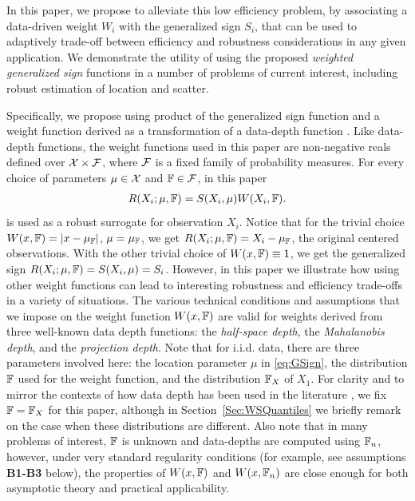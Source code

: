 In this paper, we propose to alleviate this low efficiency problem, by associating 
a data-driven weight $W_{i}$ with the generalized sign $S_{i}$, that can be used 
to adaptively trade-off between efficiency and robustness considerations in any given 
application. We demonstrate the utility of using the proposed \textit{weighted generalized sign} functions in a number of problems of current interest, including robust estimation of location and scatter.

Specifically, we propose using product of the generalized sign function and a weight function derived as a transformation of a data-depth function \citep{ref:DIMACS061_Serfling, ref:AoS00461_ZuoSerfling}. Like data-depth functions, the weight functions used in this paper are non-negative reals defined over $\mathcal{X} \times \mathcal{F}$, where $\mathcal{F}$ is a fixed family of probability measures. For every choice of parameters $\mu \in \mathcal{X}$ and ${\mathbb{F}} \in \mathcal{F}$, in this paper
%
\begin{align}
R (X_{i}; \mu, {\mathbb{F}}) = S( X_{i}, \mu) W( X_{i}, {\mathbb{F}}).
\label{eqn:rank}
\end{align}
%
is used as a robust surrogate for observation $X_{i}$.
Notice that for the trivial choice $W( x, {\mathbb{F}}) = | x - \mu_{{\mathbb{F}}} |$, 
 $\mu = \mu_{{\mathbb{F}}}$,  we get $R (X_{i}; \mu, {\mathbb{F}}) = X_{i}-\mu_{{\mathbb{F}}}$, the original centered observations. 
 With the other trivial choice of  $W( x, {\mathbb{F}}) \equiv 1$, we get the 
 generalized  sign $R (X_{i}; \mu, {\mathbb{F}}) = S(X_{i}, \mu) = S_{i}$. 
 However, in this paper we illustrate how using other weight functions
 can lead to interesting robustness and efficiency trade-offs in a variety of situations. 
 The various technical conditions and assumptions that we impose on the 
 weight function $W( x, {\mathbb{F}})$ are valid for weights derived 
 from three well-known data depth functions: the \textit{half-space depth}, 
 the \textit{Mahalanobis depth}, and the \textit{projection depth}. Note that for i.i.d. data, there are three parameters involved here: the location parameter $\mu$ in 
 \eqref{eq:GSign}, the distribution ${\mathbb{F}}$ used for the weight function, and the distribution ${\mathbb{F}}_{X}$ of $X_{1}$. For clarity and to mirror the contexts of how data depth has been used in the literature \citep{LiuPareliusSingh99, ref:DIMACS061_Serfling}, we fix ${\mathbb{F}} = {\mathbb{F}}_{X}$ for this paper, although in Section~\ref{Sec:WSQuantiles} we briefly remark on the case when these  distributions are different. Also note that 
 in many problems of interest, ${\mathbb{F}}$ is 
unknown and  data-depths are computed using ${\mathbb{F}}_{n}$, however, under very standard regularity conditions (for example, see assumptions \textbf{B1-B3} below), the 
properties of $W (x, {\mathbb{F}})$ and $W (x, {\mathbb{F}}_{n})$ are close enough for both asymptotic theory and practical applicability.  
 
